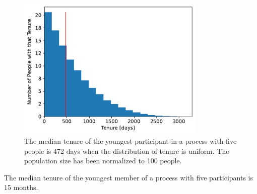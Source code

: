 \begin{figure}[!htb]  %
    \centering
    \includegraphics[width=0.8\textwidth]{images/tenure_uniform_distribution_with_max_tenure10_and_5_participants_median472.pdf}
    \caption{The median tenure of the youngest participant
 in a process with five people is 472 days when the distribution of tenure is uniform. The population size has been normalized to 100 people.}
    \label{fig:tenure-uniform-5-participants}
\end{figure}

The median tenure of the youngest member of a process with five participants is 15 months. 

\FloatBarrier